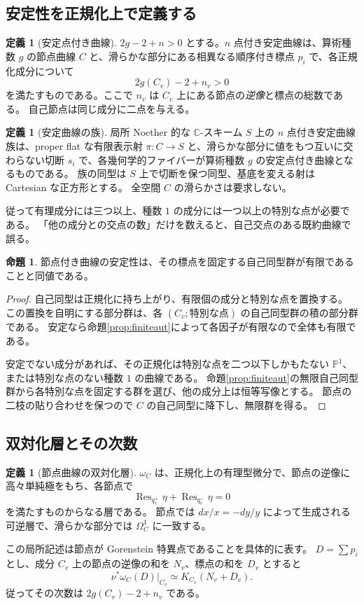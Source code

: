 \documentclass[dvipdfmx,a4paper,11pt]{article}
\theoremstyle{definition}
\newtheorem{prop}[thm]{命題}
\newtheorem{dfn}[thm]{定義}
\newcommand{\C}{\mathbb C}\newcommand{\R}{\mathbb R}\newcommand{\Z}{\mathbb Z}\newcommand{\Q}{\mathbb Q}
\newcommand{\PP}{\mathbb P}\newcommand{\HH}{\mathbb H}
\begin{document}
\subsection{安定性を正規化上で定義する}
\begin{dfn}[安定点付き曲線]\label{def:stable}
$2g-2+n>0$ とする。$n$ 点付き安定曲線は、算術種数 $g$ の節点曲線 $C$ と、滑らかな部分にある相異なる順序付き標点 $p_i$ で、各正規化成分について
\[
2g(C_v)-2+n_v>0
\]
を満たすものである。ここで $n_v$ は $C_v$ 上にある節点の\emph{逆像}と標点の総数である。
自己節点は同じ成分に二点を与える。
\end{dfn}
\begin{dfn}[安定曲線の族]
局所 Noether 的な $\C$-スキーム $S$ 上の $n$ 点付き安定曲線族は、proper flat な有限表示射 $\pi:C\to S$ と、滑らかな部分に値をもつ互いに交わらない切断 $s_i$ で、各幾何学的ファイバーが算術種数 $g$ の安定点付き曲線となるものである。
族の同型は $S$ 上で切断を保つ同型、基底を変える射は Cartesian な正方形とする。
全空間 $C$ の滑らかさは要求しない。
\end{dfn}
従って有理成分には三つ以上、種数 $1$ の成分には一つ以上の特別な点が必要である。
「他の成分との交点の数」だけを数えると、自己交点のある既約曲線で誤る。

\begin{prop}\label{prop:stablefinite}
節点付き曲線の安定性は、その標点を固定する自己同型群が有限であることと同値である。
\end{prop}
\begin{proof}
自己同型は正規化に持ち上がり、有限個の成分と特別な点を置換する。
この置換を自明にする部分群は、各 $(C_v;\text{特別な点})$ の自己同型群の積の部分群である。
安定なら命題\ref{prop:finiteaut}によって各因子が有限なので全体も有限である。

安定でない成分があれば、その正規化は特別な点を二つ以下しかもたない $\PP^1$、または特別な点のない種数 $1$ の曲線である。
命題\ref{prop:finiteaut}の無限自己同型群から各特別な点を固定する群を選び、他の成分上は恒等写像とする。
節点の二枝の貼り合わせを保つので $C$ の自己同型に降下し、無限群を得る。
\end{proof}

\subsection{双対化層とその次数}
\begin{dfn}[節点曲線の双対化層]\label{def:dualizing}
$\omega_C$ は、正規化上の有理型微分で、節点の逆像に高々単純極をもち、各節点で
\[
\operatorname{Res}_{q_e^+}\eta+\operatorname{Res}_{q_e^-}\eta=0
\]
を満たすものからなる層である。
節点では $dx/x=-dy/y$ によって生成される可逆層で、滑らかな部分では $\Omega_C^1$ に一致する。
\end{dfn}
この局所記述は節点が Gorenstein 特異点であることを具体的に表す。
$D=\sum p_i$ とし、成分 $C_v$ 上の節点の逆像の和を $N_v$、標点の和を $D_v$ とすると
\[
\nu^*\omega_C(D)|_{C_v}\simeq K_{C_v}(N_v+D_v).
\]
従ってその次数は $2g(C_v)-2+n_v$ である。
\end{document}
